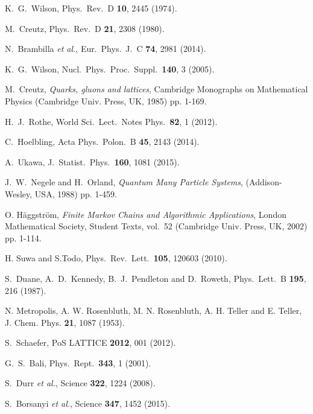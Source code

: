 \begin{thebibliography}{99.}%

  K.~G.~Wilson, Phys.\ Rev.\ D {\bf 10},  2445  (1974).
  
  M.~Creutz, Phys.\ Rev.\ D {\bf 21},  2308 (1980). 
  
  N.~Brambilla {\it et al.}, Eur.\ Phys.\ J.\ C {\bf 74},  2981 (2014).
   
  K.~G.~Wilson,  Nucl.\ Phys.\ Proc.\ Suppl.\  {\bf 140},  3 (2005).
  
  M.~Creutz, {\em Quarks, gluons and lattices}, 
  Cambridge Monographs on Mathematical Physics (Cambridge Univ. Press, UK, 1985) pp. 1-169.
    
  H.~J.~Rothe, World Sci.\ Lect.\ Notes Phys.~{\bf 82}, 1 (2012).

  C.~Hoelbling, Acta Phys.\ Polon.\ B {\bf 45},   2143 (2014).


  A.~Ukawa, J.\ Statist.\ Phys.\  {\bf 160},  1081 (2015).
 
  J.~W.~Negele and H.~Orland,
 {\em Quantum Many Particle Systems}, (Addison-Wesley, USA, 1988) pp. 1-459.    

  O. H\"{a}ggstr\"{o}m,
  {\em Finite Markov Chains and Algorithmic Applications}, 
 London Mathematical Society, Student Texts, vol.~52   (Cambridge Univ. Press, UK, 2002) pp. 1-114.    

 H. Suwa and S.Todo,
 Phys.\ Rev.\ Lett.\ {\bf 105},  120603 (2010).

  S.~Duane, A.~D.~Kennedy, B.~J.~Pendleton and D.~Roweth, Phys.\ Lett.\ B {\bf 195},  216 (1987).

  
 N. Metropolis, A. W. Rosenbluth, M. N. Rosenbluth, A. H. Teller and E. Teller, J. Chem. Phys. {\bf 21},  1087 (1953).
  
  S.~Schaefer, PoS LATTICE {\bf 2012},  001 (2012).
  
  G.~S.~Bali, Phys.\ Rept.\  {\bf 343},  1 (2001).

  S.~Durr {\it et al.}, Science {\bf 322},  1224 (2008).
  
  S.~Borsanyi {\it et al.}, Science {\bf 347},  1452 (2015).
  

\end{thebibliography}
